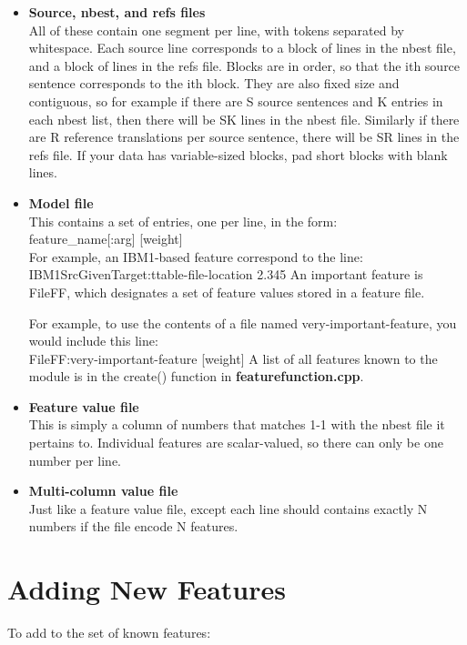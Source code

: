 \documentclass[12pt]{amsart}
\newcommand{\file}{\textbf} \newcommand{\url}{\underline}
\begin{document}
\begin{itemize}

\item \textbf{Source, nbest, and refs files}\\
  All of these contain one segment per line, with tokens separated by
  whitespace.  Each source line corresponds to a block of lines in the nbest
  file, and a block of lines in the refs file.  Blocks are in order, so that
  the ith source sentence corresponds to the ith block.  They are also fixed
  size and contiguous, so for example if there are S source sentences and K
  entries in each nbest list, then there will be SK lines in the nbest file.
  Similarly if there are R reference translations per source sentence, there
  will be SR lines in the refs file.  If your data has variable-sized blocks,
  pad short blocks with blank lines.

\item \textbf{Model file}\\
  This contains a set of entries, one per line, in the form:\\
  feature\_name[:arg] [weight]\\ For example, an IBM1-based feature correspond
  to the line:\\ IBM1SrcGivenTarget:ttable-file-location 2.345 An important
  feature is FileFF, which designates a set of feature values stored in a
  feature file.

  For example, to use the contents of a file named very-important-feature, you
  would include this line:\\ FileFF:very-important-feature [weight] A list of
  all features known to the module is in the create() function in
  \file{featurefunction.cpp}.

\item \textbf{Feature value file}\\
  This is simply a column of numbers that matches 1-1 with the nbest file it
  pertains to.  Individual features are scalar-valued, so there can only be one
  number per line.

\item \textbf{Multi-column value file}\\
  Just like a feature value file, except each line should contains exactly N
  numbers if the file encode N features.

\end{itemize}

\section*{Adding New Features}
To add to the set of known features:
\end{document}

